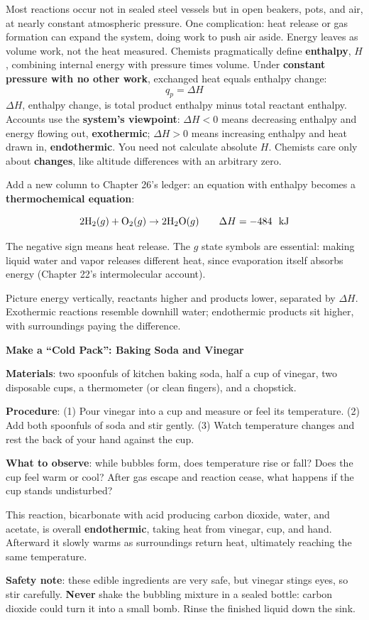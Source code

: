 \begin{qiaoliang}
Most reactions occur not in sealed steel vessels but in open beakers, pots, and air, at nearly constant atmospheric pressure. One complication: heat release or gas formation can expand the system, doing work to push air aside. Energy leaves as volume work, not the heat measured. Chemists pragmatically define \textbf{enthalpy}, $H$, combining internal energy with pressure times volume. Under \textbf{constant pressure with no other work}, exchanged heat equals enthalpy change:
\[ q_p = \Delta H \]
$\Delta H$, enthalpy change, is total product enthalpy minus total reactant enthalpy. Accounts use the \textbf{system's viewpoint}: $\Delta H<0$ means decreasing enthalpy and energy flowing out, \textbf{exothermic}; $\Delta H>0$ means increasing enthalpy and heat drawn in, \textbf{endothermic}. You need not calculate absolute $H$. Chemists care only about \textbf{changes}, like altitude differences with an arbitrary zero.
\end{qiaoliang}

Add a new column to Chapter 26's ledger: an equation with enthalpy becomes a \textbf{thermochemical equation}:

\[ \chem{2H_2}(g) + \chem{O_2}(g) \rightarrow \chem{2H_2O}(g) \qquad \Delta H = -484\ \ud{}{kJ} \]

The negative sign means heat release. The $g$ state symbols are essential: making liquid water and vapor releases different heat, since evaporation itself absorbs energy (Chapter 22's intermolecular account).

Picture energy vertically, reactants higher and products lower, separated by $\Delta H$. Exothermic reactions resemble downhill water; endothermic products sit higher, with surroundings paying the difference.

\begin{shiyan}
\textbf{Make a ``Cold Pack'': Baking Soda and Vinegar}

\textbf{Materials}: two spoonfuls of kitchen baking soda, half a cup of vinegar, two disposable cups, a thermometer (or clean fingers), and a chopstick.

\textbf{Procedure}: (1) Pour vinegar into a cup and measure or feel its temperature. (2) Add both spoonfuls of soda and stir gently. (3) Watch temperature changes and rest the back of your hand against the cup.

\textbf{What to observe}: while bubbles form, does temperature rise or fall? Does the cup feel warm or cool? After gas escape and reaction cease, what happens if the cup stands undisturbed?

This reaction, bicarbonate with acid producing carbon dioxide, water, and acetate, is overall \textbf{endothermic}, taking heat from vinegar, cup, and hand. Afterward it slowly warms as surroundings return heat, ultimately reaching the same temperature.

\textbf{Safety note}: these edible ingredients are very safe, but vinegar stings eyes, so stir carefully. \textbf{Never} shake the bubbling mixture in a sealed bottle: carbon dioxide could turn it into a small bomb. Rinse the finished liquid down the sink.
\end{shiyan}

